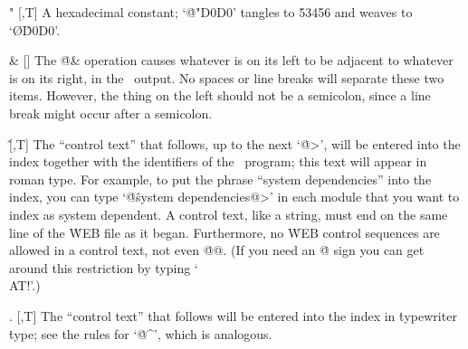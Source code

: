 \@" [\PAS,T] A hexadecimal constant; `\.{@"D0D0}' tangles to \.{53456} and
weaves to `\O{\^D0D0}'.


%

\@\& [\PAS] The \.{@\&} operation causes whatever is on its left to be
adjacent to whatever is on its right, in the \PASCAL\ output.
No spaces or
line breaks will separate these two items.
However, the thing on the left
should not be a semicolon, since a line break might occur after a semicolon.

\@\^ [\PAS,T] The ``control text'' that follows, up to the next
`\.{@>}', will be entered into the index together with the identifiers of
the \PASCAL\ program; this text will appear in roman type.
For example, to
put the phrase ``system dependencies'' into the index, you can type
`\.{@\^system dependencies@>}' in each module
that you want to index as system dependent.
A control text, like a string,
must end on the same line of the \.{WEB} file as it began.
Furthermore,
no \.{WEB} control sequences are allowed in a control text, not even
\.{@@}.
(If you need an \.{@} sign you can get around this restriction by
typing `\.{\\AT!}'.)

\@.
[\PAS,T] The ``control text'' that follows will be entered into the index
in \.{typewriter} \.{type}; see the rules for `\.{@\^}', which is analogous.

